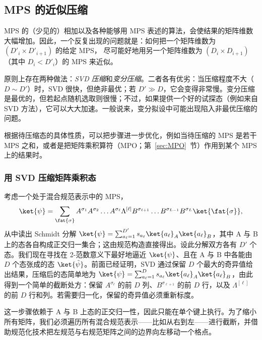 \subsection{MPS 的近似压缩}

MPS 的（少见的）相加以及各种能够用 MPS 表述的算法，会使结果的矩阵维数大幅增加。因此，一个反复出现的问题就是：如何把一个矩阵维数为 $(D'_i \times D'_{i+1})$ 的给定 MPS，
尽可能好地用另一个矩阵维数为 $(D_i \times D_{i+1})$（其中 $D_i < D'_i$）的 MPS 来近似。

原则上存在两种做法：{\em SVD 压缩}和{\em 变分压缩}。二者各有优劣：当压缩程度不大（$D \sim D'$）时，SVD 很快，但绝非最优；若 $D' \gg D$，它会变得非常慢。变分压缩是最优的，但若起点随机选取则很慢；不过，如果提供一个好的试探态（例如来自 SVD 方法），它可以大大加速。一般说来，变分拟设中可能出现陷入非最优压缩的问题。
 
根据待压缩态的具体性质，可以把步骤进一步优化，例如当待压缩的 MPS 是若干 MPS 之和，或者是把矩阵乘积算符（MPO；第~\ref{sec:MPO}~节）作用到某个 MPS 上的结果时。

\subsubsection{用 SVD 压缩矩阵乘积态}
考虑一个处于混合规范表示中的 MPS，
\begin{equation}
\ket{\psi} = \sum_{\fat{\sigma}} A^{\sigma_1} A^{\sigma_2} \ldots A^{\sigma_{\ell}} \Lambda^{[\ell]} B^{\sigma_{\ell+1}} \ldots B^{\sigma_{L-1}} B^{\sigma_L}  \ket{\fat{\sigma}} ,
\label{eq:compressionstart}
\end{equation}
从中读出 Schmidt 分解 $\ket{\psi} = \sum_{a_\ell=1}^{D'} s_{a_\ell} \ket{a_\ell}_A \ket{a_\ell}_B$，其中 A 与 B 上的态各自构成正交归一集合；这由规范构造直接得出。设此分解双方各有 $D'$ 个态。我们现在寻找在 2-范数意义下最好地逼近 $\ket{\psi}$、且在 A 与 B 中各能由 $D$ 个态张成的态 $\ket{\tilde{\psi}}$。前面已经证明，SVD 通过保留 $D$ 个最大的奇异值给出结果，压缩后的态简单地为 $\ket{\psi} = \sum_{a_\ell=1}^{D} s_{a_\ell} \ket{a_\ell}_A \ket{a_\ell}_B$，由此得到一个简单的截断处方：保留 $A^{\sigma_{\ell}}$ 的前 $D$ 列、$B^{\sigma_{\ell+1}}$ 的前 $D$ 行，以及 $\Lambda^{[\ell]}$ 的前 $D$ 行和列。若需要归一化，保留的奇异值必须重新标度。

这一步骤依赖于 A 与 B 上态的正交归一性，因此只能在单个键上执行。为了缩小所有矩阵，我们必须遍历所有混合规范表示——比如从右到左——进行截断，并借助规范化技术把左规范与右规范矩阵之间的边界向左移动一个格点。

